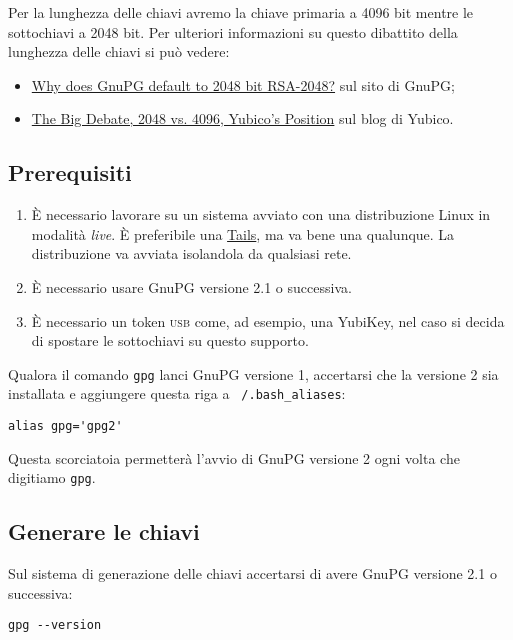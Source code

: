 \documentclass[a4paper,10pt]{article}
\begin{document}
Per la lunghezza delle chiavi avremo la chiave primaria a 4096 bit mentre le sottochiavi a 2048 bit. Per ulteriori informazioni su questo dibattito della lunghezza delle chiavi si può vedere:

\begin{itemize}
 \item \href{https://www.gnupg.org/faq/gnupg-faq.html#default_rsa2048}{Why does GnuPG default to 2048 bit RSA-2048?} sul sito di GnuPG;
 \item \href{https://www.yubico.com/2015/02/big-debate-2048-4096-yubicos-stand/}{The Big Debate, 2048 vs. 4096, Yubico’s Position} sul blog di Yubico.
\end{itemize}

\subsection{Prerequisiti}

\begin{enumerate}
 \item È necessario lavorare su un sistema avviato con una distribuzione Linux in modalità \textit{live}. È preferibile una \href{https://tails.boum.org/index.it.html}{Tails}, ma va bene una qualunque. La distribuzione va avviata isolandola da qualsiasi rete.
 \item È necessario usare GnuPG versione 2.1 o successiva.
 \item È necessario un token \textsc{usb} come, ad esempio, una YubiKey, nel caso si decida di spostare le sottochiavi su questo supporto.
\end{enumerate}

Qualora il comando \texttt{gpg} lanci GnuPG versione 1, accertarsi che la versione 2 sia installata e aggiungere questa riga a \texttt{~/.bash\_aliases}:

\begin{verbatim}
alias gpg='gpg2'
\end{verbatim}

Questa scorciatoia permetterà l'avvio di GnuPG versione 2 ogni volta che digitiamo \texttt{gpg}.

\subsection{Generare le chiavi}

Sul sistema di generazione delle chiavi accertarsi di avere GnuPG versione 2.1 o successiva:

\begin{verbatim}
gpg --version
\end{verbatim}
\end{document}
